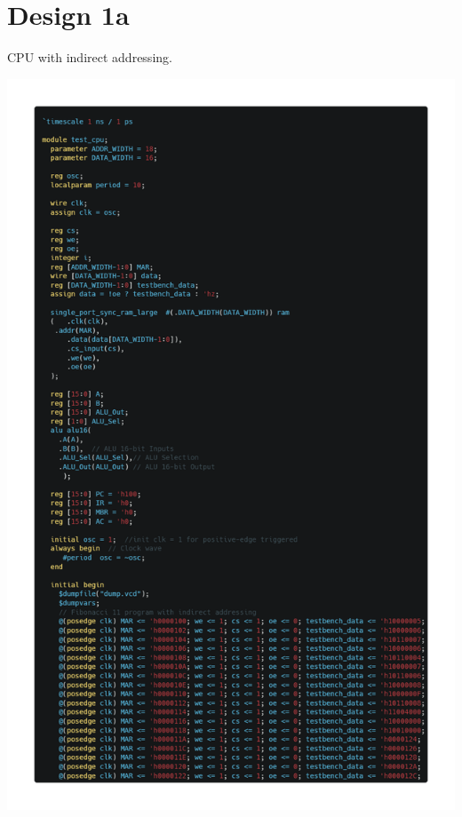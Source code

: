 \documentclass[12pt]{article}
\begin{document}
\section{Design 1a}
CPU with indirect addressing.
\begin{center}
    \includegraphics[scale=0.35]{images/a_1.png}
\end{center}
\end{document}
